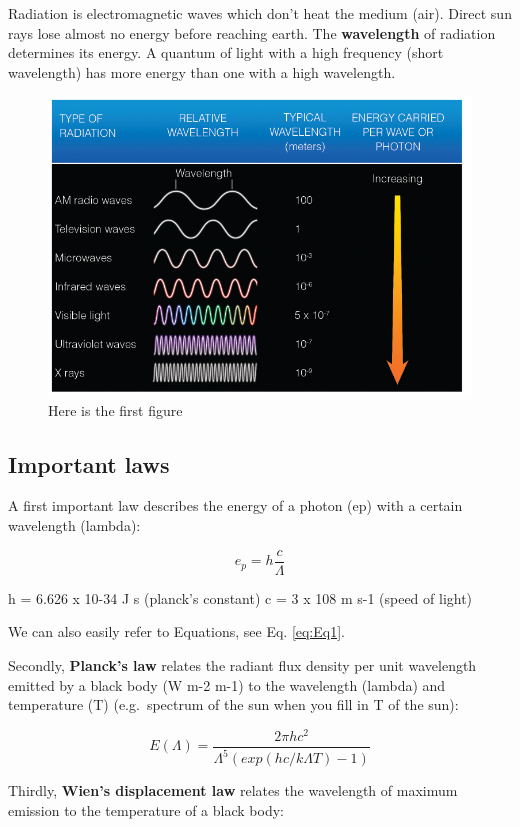 \documentclass[oneside]{book}
\begin{document}
Radiation is electromagnetic waves which don't heat the medium (air).
Direct sun rays lose almost no energy before reaching earth. The
\textbf{wavelength} of radiation determines its energy. A quantum of
light with a high frequency (short wavelength) has more energy than one
with a high wavelength.

\begin{figure}

{\centering \includegraphics[width=0.5\linewidth]{figures/Figure120} 

}

\caption{Here is the first figure}\label{fig:Radiation}
\end{figure}

\subsection{Important laws}\label{important-laws}

A first important law describes the energy of a photon (ep) with a
certain wavelength (lambda):

\begin{equation} 
  e_p = h  \frac{c}{\Lambda}
  \label{eq:Eq1}
\end{equation}

h = 6.626 x 10-34 J s (planck's constant) c = 3 x 108 m s-1 (speed of
light)

We can also easily refer to Equations, see Eq. \eqref{eq:Eq1}.

Secondly, \textbf{Planck's law} relates the radiant flux density per
unit wavelength emitted by a black body (W m-2 m-1) to the wavelength
(lambda) and temperature (T) (e.g.~spectrum of the sun when you fill in
T of the sun):

\begin{equation} 
  E(\Lambda) =\frac{2 \pi h c^2}{\Lambda^5\left(exp(hc/k\Lambda T) - 1 \right)}
  \label{eq:Eq2}
\end{equation}

Thirdly, \textbf{Wien's displacement law} relates the wavelength of
maximum emission to the temperature of a black body:
\end{document}
